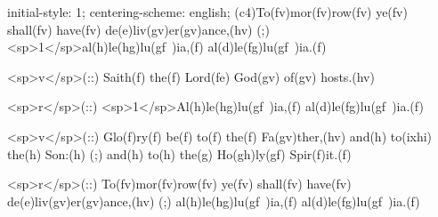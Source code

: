 initial-style: 1;
centering-scheme: english;
(c4)To(fv)mor(fv)row(fv) ye(fv) shall(fv) have(fv) de(e)liv(gv)er(gv)ance,(hv) (;) <sp>1</sp>al(h)le(hg)lu(gf~)ia,(f) al(d)le(fg)lu(gf~)ia.(f) 

<sp>v</sp>(::) Saith(f) the(f) Lord(fe) God(gv) of(gv) hosts.(hv) 

<sp>r</sp>(::) <sp>1</sp>Al(h)le(hg)lu(gf~)ia,(f) al(d)le(fg)lu(gf~)ia.(f) 

<sp>v</sp>(::) Glo(f)ry(f) be(f) to(f) the(f) Fa(gv)ther,(hv) and(h) to(ixhi) the(h) Son:(h) (;) and(h) to(h) the(g) Ho(gh)ly(gf) Spir(f)it.(f)

<sp>r</sp>(::) To(fv)mor(fv)row(fv) ye(fv) shall(fv) have(fv) de(e)liv(gv)er(gv)ance,(hv) (;) al(h)le(hg)lu(gf~)ia,(f) al(d)le(fg)lu(gf~)ia.(f) 